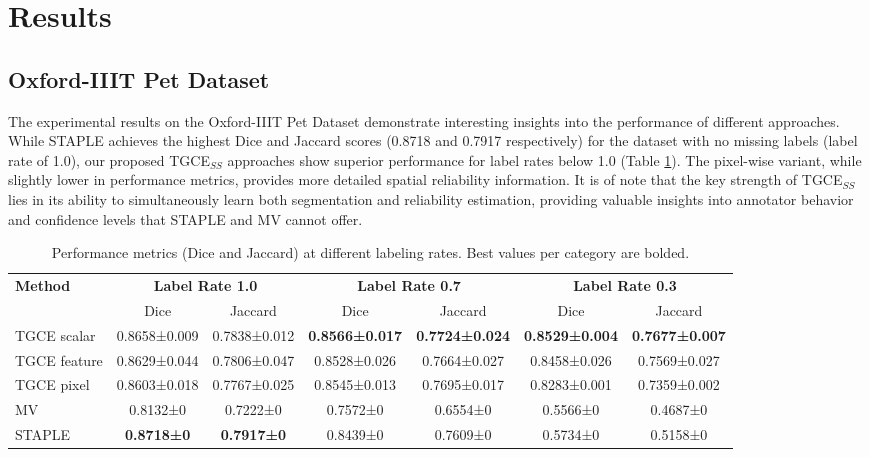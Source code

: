 \section{Results}

\subsection{Oxford-IIIT Pet Dataset}

The experimental results on the Oxford-IIIT Pet Dataset demonstrate
interesting insights into the performance of different approaches.
While STAPLE achieves the highest Dice and Jaccard scores (0.8718 and
0.7917 respectively) for the dataset with no missing labels (label
rate of 1.0), our proposed TGCE$_{SS}$ approaches show superior
performance for label rates below 1.0 (Table \ref{tab:oxford_pet_results}).
The pixel-wise variant, while slightly lower in performance metrics,
provides more detailed spatial reliability information. It is of note
that the key strength of TGCE$_{SS}$ lies in its ability to
simultaneously learn both segmentation and reliability estimation,
providing valuable insights into annotator behavior and confidence
levels that STAPLE and MV cannot offer.
\begin{table}[h]
  \centering
  \begin{tabular}{lcccccc}
    \hline
    \textbf{Method} & \multicolumn{2}{c}{\textbf{Label Rate 1.0}} &
    \multicolumn{2}{c}{\textbf{Label Rate 0.7}} &
    \multicolumn{2}{c}{\textbf{Label Rate 0.3}} \\
    & Dice & Jaccard & Dice & Jaccard & Dice & Jaccard \\
    \hline
    TGCE scalar   & 0.8658±0.009 & 0.7838±0.012 &
    \textbf{0.8566±0.017} & \textbf{0.7724±0.024} &
    \textbf{0.8529±0.004} & \textbf{0.7677±0.007} \\
    TGCE feature  & 0.8629±0.044 & 0.7806±0.047 & 0.8528±0.026 &
    0.7664±0.027 & 0.8458±0.026 & 0.7569±0.027 \\
    TGCE pixel    & 0.8603±0.018 & 0.7767±0.025 & 0.8545±0.013 & %
    0.7695±0.017 & 0.8283±0.001 & 0.7359±0.002 \\
    MV            & 0.8132±0     & 0.7222±0     & 0.7572±0     &
    0.6554±0     & 0.5566±0     & 0.4687±0 \\
    STAPLE        & \textbf{0.8718±0} & \textbf{0.7917±0} & 0.8439±0
    & 0.7609±0     & 0.5734±0     & 0.5158±0 \\
    \hline
  \end{tabular}
  \caption{Performance metrics (Dice and Jaccard) at different
  labeling rates. Best values per category are bolded.}
  \label{tab:oxford_pet_results}
\end{table}

